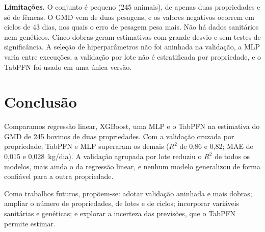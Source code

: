 \documentclass[conference]{IEEEtran}
\begin{document}
\textbf{Limitações.} O conjunto é pequeno (245 animais), de apenas duas propriedades e só de fêmeas. O GMD vem de duas pesagens, e os valores negativos ocorrem em ciclos de 43 dias, nos quais o erro de pesagem pesa mais. Não há dados sanitários nem genéticos. Cinco dobras geram estimativas com grande desvio e sem testes de significância. A seleção de hiperparâmetros não foi aninhada na validação, a MLP varia entre execuções, a validação por lote não é estratificada por propriedade, e o TabPFN foi usado em uma única versão.

\section{Conclusão}\label{sec:concl}

Comparamos regressão linear, XGBoost, uma MLP e o TabPFN na estimativa do GMD de 245 bovinos de duas propriedades. Com a validação cruzada por propriedade, TabPFN e MLP superaram os demais ($R^2$ de 0,86 e 0,82; MAE de 0,015 e 0,028~kg/dia). A validação agrupada por lote reduziu o $R^2$ de todos os modelos, mais ainda o da regressão linear, e nenhum modelo generalizou de forma confiável para a outra propriedade.

Como trabalhos futuros, propõem-se: adotar validação aninhada e mais dobras; ampliar o número de propriedades, de lotes e de ciclos; incorporar variáveis sanitárias e genéticas; e explorar a incerteza das previsões, que o TabPFN permite estimar.



\end{document}

